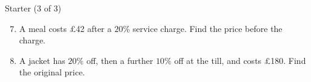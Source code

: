 \documentclass{beamer}
\newcommand{\ashow}[1]{\uncover<2->{\textcolor{red}{\small #1}}}
\newcommand{\tightlist}{%
  \setlength{\itemsep}{0pt}\setlength{\parskip}{0pt}\setlength{\topsep}{0pt}%
}
\newenvironment{ealglossed}{\par\linespread{2.1}\selectfont\ignorespaces}{\par}
\begin{document}
\begin{frame}[t]{Starter (3 of 3)}
\begin{ealglossed}
\vspace{-1.8em}
\footnotesize
\begin{enumerate}\setcounter{enumi}{6}\tightlist
  \item A meal costs \pounds42 after a $20\%$ service charge. Find the price before the charge.
        \ashow{$42\div1.2=$ \pounds35}
  \item A jacket has $20\%$ off, then a further $10\%$ off at the till, and costs \pounds180.
        Find the original price.
        \ashow{$0.8\times0.9=0.72$, so $180\div0.72=$ \pounds250.}
\end{enumerate}
\end{ealglossed}
\end{frame}
\end{document}
